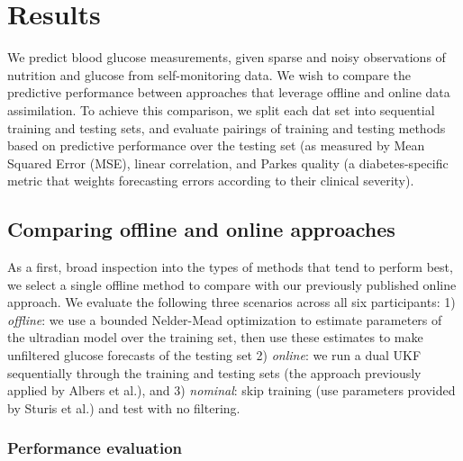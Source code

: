 \documentclass[10pt,letterpaper]{article}
\begin{document}
\section{Results}

We predict blood glucose measurements, given sparse and noisy observations of nutrition and glucose from self-monitoring data. We wish to compare the predictive performance between approaches that leverage offline and online data assimilation. To achieve this comparison, we split each dat set into sequential training and testing sets, and evaluate pairings of training and testing methods based on predictive performance over the testing set (as measured by Mean Squared Error (MSE), linear correlation, and Parkes quality (a diabetes-specific metric that weights forecasting errors according to their clinical severity).


\subsection{Comparing offline and online approaches}
\label{smallExperiment}
As a first, broad inspection into the types of methods that tend to perform best, we select a single offline method to compare with our previously published online approach. We evaluate the following three scenarios across all six participants: 1) \emph{offline}: we use a bounded Nelder-Mead optimization to estimate parameters of the ultradian model over the training set, then use these estimates to make unfiltered glucose forecasts of the testing set 2) \emph{online}: we run a dual UKF sequentially through the training and testing sets (the approach previously applied by Albers et al.), and 3) \emph{nominal}: skip training (use parameters provided by Sturis et al.) and test with no filtering. 

\subsubsection{Performance evaluation}
\end{document}
